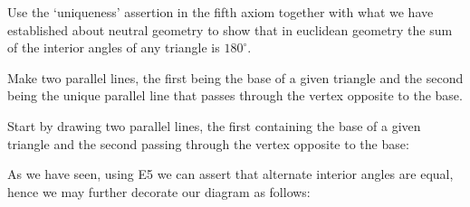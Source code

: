 \documentclass[newpage,hints,handout]{ximera}
\begin{document}
\begin{problem}
Use the `uniqueness' assertion in the fifth axiom together with what
we have established about neutral geometry to show that in euclidean geometry
the sum of the interior angles of any triangle is $180^\circ$.

\begin{hint}
Make two parallel lines, the first being the base of a given triangle
and the second being the unique parallel line that passes through the
vertex opposite to the base.
\end{hint}
\begin{freeResponse}
Start by drawing two parallel lines, the first containing the base of a
given triangle and the second passing through the vertex opposite to
the base:
\begin{image}
\end{image}
As we have seen, using E5 we can assert that alternate interior angles
are equal, hence we may further decorate our diagram as follows: 
\begin{image}
\end{image}
\end{freeResponse}
\end{problem}
\end{document}
